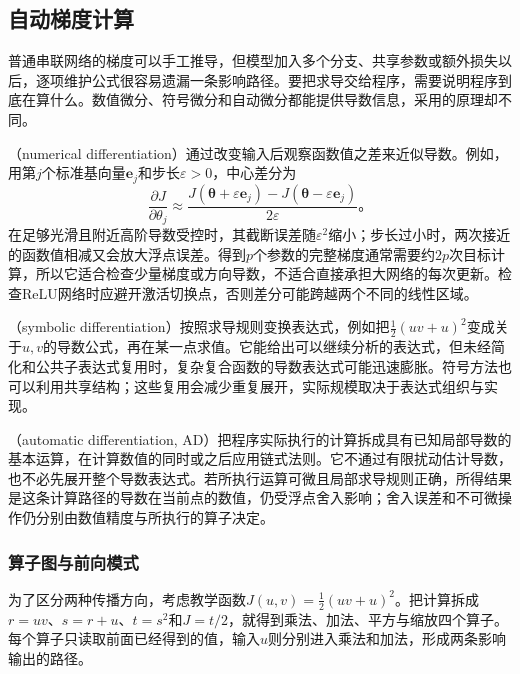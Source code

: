 \subsection{自动梯度计算}
\label{sec:ffn-autodiff}

普通串联网络的梯度可以手工推导，但模型加入多个分支、共享参数或额外损失以后，逐项维护公式很容易遗漏一条影响路径。要把求导交给程序，需要说明程序到底在算什么。数值微分、符号微分和自动微分都能提供导数信息，采用的原理却不同。

（numerical differentiation）通过改变输入后观察函数值之差来近似导数。例如，用第$j$个标准基向量$\bm{e}_j$和步长$\varepsilon>0$，中心差分为
\begin{equation}
  \frac{\partial J}{\partial\theta_j}
  \approx
  \frac{J(\bm{\theta}+\varepsilon\bm{e}_j)
       -J(\bm{\theta}-\varepsilon\bm{e}_j)}{2\varepsilon}\text{。}
  \label{eq:ffn-finite-difference}
\end{equation}
在足够光滑且附近高阶导数受控时，其截断误差随$\varepsilon^2$缩小；步长过小时，两次接近的函数值相减又会放大浮点误差。得到$p$个参数的完整梯度通常需要约$2p$次目标计算，所以它适合检查少量梯度或方向导数，不适合直接承担大网络的每次更新。检查ReLU网络时应避开激活切换点，否则差分可能跨越两个不同的线性区域。

（symbolic differentiation）按照求导规则变换表达式，例如把$\frac12(uv+u)^2$变成关于$u,v$的导数公式，再在某一点求值。它能给出可以继续分析的表达式，但未经简化和公共子表达式复用时，复杂复合函数的导数表达式可能迅速膨胀。符号方法也可以利用共享结构；这些复用会减少重复展开，实际规模取决于表达式组织与实现。

（automatic differentiation, AD）把程序实际执行的计算拆成具有已知局部导数的基本运算，在计算数值的同时或之后应用链式法则。它不通过有限扰动估计导数，也不必先展开整个导数表达式。若所执行运算可微且局部求导规则正确，所得结果是这条计算路径的导数在当前点的数值，仍受浮点舍入影响；舍入误差和不可微操作仍分别由数值精度与所执行的算子决定。

\subsubsection{算子图与前向模式}
\label{sec:ffn-autodiff-forward}

为了区分两种传播方向，考虑教学函数$J(u,v)=\frac12(uv+u)^2$。把计算拆成$r=uv$、$s=r+u$、$t=s^2$和$J=t/2$，就得到乘法、加法、平方与缩放四个算子。每个算子只读取前面已经得到的值，输入$u$则分别进入乘法和加法，形成两条影响输出的路径。

